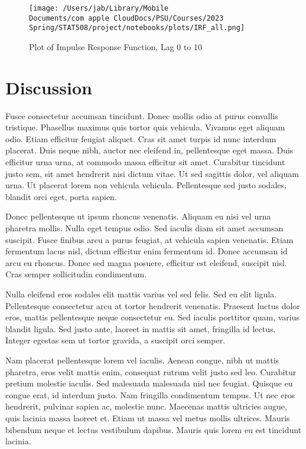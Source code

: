 \documentclass{article}
\begin{document}
\begin{figure}
\centering
  \texttt{[image: /Users/jab/Library/Mobile Documents/com~apple~CloudDocs/PSU/Courses/2023 Spring/STAT508/project/notebooks/plots/IRF\_all.png]}
  \caption{Plot of Impulse Response Function, Lag 0 to 10}
\end{figure}



\hypertarget{discussion}{%
\section{Discussion}\label{discussion}}

Fusce consectetur accumsan tincidunt. Donec mollis odio at purus
convallis tristique. Phasellus maximus quis tortor quis vehicula.
Vivamus eget aliquam odio. Etiam efficitur feugiat aliquet. Cras sit
amet turpis id nunc interdum placerat. Duis neque nibh, auctor nec
eleifend in, pellentesque eget massa. Duis efficitur urna urna, at
commodo massa efficitur sit amet. Curabitur tincidunt justo sem, sit
amet hendrerit nisi dictum vitae. Ut sed sagittis dolor, vel aliquam
urna. Ut placerat lorem non vehicula vehicula. Pellentesque sed justo
sodales, blandit orci eget, porta sapien.

Donec pellentesque ut ipsum rhoncus venenatis. Aliquam eu nisi vel urna
pharetra mollis. Nulla eget tempus odio. Sed iaculis diam sit amet
accumsan suscipit. Fusce finibus arcu a purus feugiat, at vehicula
sapien venenatis. Etiam fermentum lacus nisl, dictum efficitur enim
fermentum id. Donec accumsan id arcu eu rhoncus. Donec sed magna
posuere, efficitur est eleifend, suscipit nisl. Cras semper sollicitudin
condimentum.

Nulla eleifend eros sodales elit mattis varius vel sed felis. Sed eu
elit ligula. Pellentesque consectetur arcu at tortor hendrerit
venenatis. Praesent luctus dolor eros, mattis pellentesque neque
consectetur eu. Sed iaculis porttitor quam, varius blandit ligula. Sed
justo ante, laoreet in mattis sit amet, fringilla id lectus. Integer
egestas sem ut tortor gravida, a suscipit orci semper.

Nam placerat pellentesque lorem vel iaculis. Aenean congue, nibh ut
mattis pharetra, eros velit mattis enim, consequat rutrum velit justo
sed leo. Curabitur pretium molestie iaculis. Sed malesuada malesuada
nisl nec feugiat. Quisque eu congue erat, id interdum justo. Nam
fringilla condimentum tempus. Ut nec eros hendrerit, pulvinar sapien ac,
molestie nunc. Maecenas mattis ultricies augue, quis lacinia massa
laoreet et. Etiam ut massa vel metus mollis ultrices. Mauris bibendum
neque et lectus vestibulum dapibus. Mauris quis lorem eu est tincidunt
lacinia.
\end{document}
